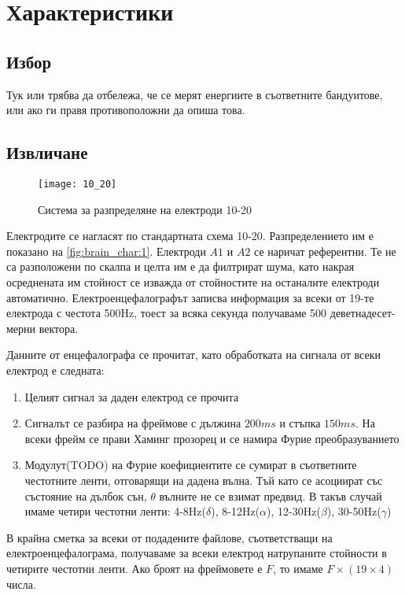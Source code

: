 \documentclass[main.tex]{subfiles}
\begin{document}
\section{Характеристики}
\subsection{Избор}
Тук или трябва да отбележа, че се мерят енергиите в съответните бандуитове, или
ако ги правя противоположни да опиша това.
\subsection{Извличане}

\begin{minipage}{0.45\textwidth}
        \begin{figure}[H]
                \texttt{[image: 10\_20]}
                \caption{Система за разпределяне на електроди 10-20}
                \label{fig:brain_char:1}
        \end{figure}
\end{minipage} \hfill
\begin{minipage}{0.45\textwidth}
        Електродите се нагласят по стандартната схема 10-20. Разпределението им е показано на \autoref{fig:brain_char:1}. Електроди $A1$ и $A2$ се наричат референтни. Те не са разположени по скалпа и целта им е да филтрират шума, като накрая осреднената им стойност се изважда от стойностите на останалите електроди автоматично. Електроенцефалографът записва информация за всеки от 19-те електрода с честота 500Hz, тоест за всяка секунда получаваме 500 деветнадесет-мерни вектора.
\end{minipage}
Данните от енцефалографа се прочитат, като обработката на сигнала от всеки електрод е следната:
\begin{enumerate}
        \item Целият сигнал за даден електрод се прочита
        \item Сигналът се разбира на фреймове с дължина $200ms$ и стъпка $150ms$. На всеки фрейм се прави Хаминг прозорец и се намира Фурие преобразуванието
        \item Модулут(TODO) на Фурие коефициентите се сумират в съответните честотните ленти, отговарящи на дадена вълна. Тъй като се асоциират със състояние на дълбок сън, $\theta$ вълните не се взимат предвид. В такъв случай имаме четири честотни ленти: 4-8Hz($\delta$), 8-12Hz($\alpha$), 12-30Hz($\beta$), 30-50Hz($\gamma$)
\end{enumerate}
В крайна сметка за всеки от подадените файлове, съответстващи на електроенцефалограма, получаваме за всеки електрод натрупаните стойности в четирите честотни ленти. Ако броят на фреймовете е $F$, то имаме $F\times (19\times4)$ числа.
\end{document}
